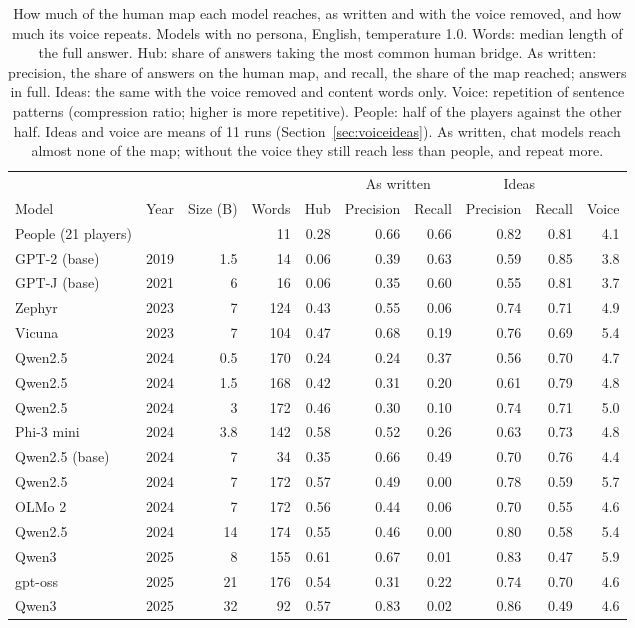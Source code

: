 \documentclass[11pt]{article}
\begin{document}
\begin{table}[H]
\centering\footnotesize\setlength{\tabcolsep}{3.5pt}\renewcommand{\arraystretch}{0.8}
\begin{tabular}{lrrrrrrrrr}
\toprule
 & & & & & \multicolumn{2}{c}{As written} & \multicolumn{2}{c}{Ideas} & \\
\cmidrule(lr){6-7}\cmidrule(lr){8-9}
Model & Year & Size (B) & Words & Hub & Precision & Recall & Precision & Recall & Voice \\
\midrule
People (21 players) & & & 11 & 0.28 & 0.66 & 0.66 & 0.82 & 0.81 & 4.1 \\
\midrule
GPT-2 (base) & 2019 & 1.5 & 14 & 0.06 & 0.39 & 0.63 & 0.59 & 0.85 & 3.8 \\
GPT-J (base) & 2021 & 6 & 16 & 0.06 & 0.35 & 0.60 & 0.55 & 0.81 & 3.7 \\
Zephyr & 2023 & 7 & 124 & 0.43 & 0.55 & 0.06 & 0.74 & 0.71 & 4.9 \\
Vicuna & 2023 & 7 & 104 & 0.47 & 0.68 & 0.19 & 0.76 & 0.69 & 5.4 \\
Qwen2.5 & 2024 & 0.5 & 170 & 0.24 & 0.24 & 0.37 & 0.56 & 0.70 & 4.7 \\
Qwen2.5 & 2024 & 1.5 & 168 & 0.42 & 0.31 & 0.20 & 0.61 & 0.79 & 4.8 \\
Qwen2.5 & 2024 & 3 & 172 & 0.46 & 0.30 & 0.10 & 0.74 & 0.71 & 5.0 \\
Phi-3 mini & 2024 & 3.8 & 142 & 0.58 & 0.52 & 0.26 & 0.63 & 0.73 & 4.8 \\
Qwen2.5 (base) & 2024 & 7 & 34 & 0.35 & 0.66 & 0.49 & 0.70 & 0.76 & 4.4 \\
Qwen2.5 & 2024 & 7 & 172 & 0.57 & 0.49 & 0.00 & 0.78 & 0.59 & 5.7 \\
OLMo 2 & 2024 & 7 & 172 & 0.56 & 0.44 & 0.06 & 0.70 & 0.55 & 4.6 \\
Qwen2.5 & 2024 & 14 & 174 & 0.55 & 0.46 & 0.00 & 0.80 & 0.58 & 5.4 \\
Qwen3 & 2025 & 8 & 155 & 0.61 & 0.67 & 0.01 & 0.83 & 0.47 & 5.9 \\
gpt-oss & 2025 & 21 & 176 & 0.54 & 0.31 & 0.22 & 0.74 & 0.70 & 4.6 \\
Qwen3 & 2025 & 32 & 92 & 0.57 & 0.83 & 0.02 & 0.86 & 0.49 & 4.6 \\
\bottomrule
\end{tabular}
\caption{How much of the human map each model reaches, as written and with the voice removed, and how much its voice repeats. Models with no persona, English, temperature 1.0. Words: median length of the full answer. Hub: share of answers taking the most common human bridge. As written: precision, the share of answers on the human map, and recall, the share of the map reached; answers in full. Ideas: the same with the voice removed and content words only. Voice: repetition of sentence patterns (compression ratio; higher is more repetitive). People: half of the players against the other half. Ideas and voice are means of 11 runs (Section~\ref{sec:voiceideas}). As written, chat models reach almost none of the map; without the voice they still reach less than people, and repeat more.}
\label{tab:models}
\end{table}
\end{document}
